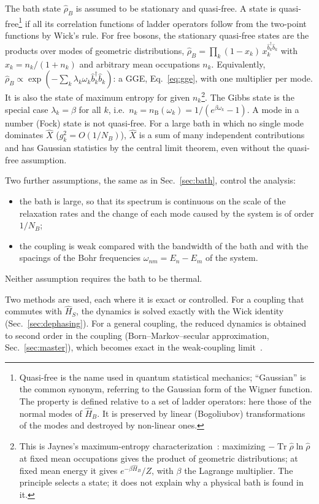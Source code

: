 \documentclass[10pt,a4paper]{article}
\newcommand{\Tr}{\operatorname{Tr}}
\begin{document}
The bath state $ \hat\rho_B $ is assumed to be stationary and quasi-free.
A state is quasi-free\footnote{Quasi-free is the name used in quantum statistical mechanics; ``Gaussian'' is the common synonym, referring to the Gaussian form of the Wigner function. The property is defined relative to a set of ladder operators: here those of the normal modes of $ \hat H_B $. It is preserved by linear (Bogoliubov) transformations of the modes and destroyed by non-linear ones.} if all its correlation functions of ladder operators follow from the two-point functions by Wick's rule.
For free bosons, the stationary quasi-free states are the products over modes of geometric distributions, $ \hat\rho_B = \prod_k (1 - x_k) \, x_k^{\hat b_k^\dagger \hat b_k} $ with $ x_k = n_k/(1+n_k) $ and arbitrary mean occupations $ n_k $.
Equivalently, $ \hat\rho_B \propto \exp(-\sum_k \lambda_k \omega_k \hat b_k^\dagger \hat b_k) $: a GGE, Eq.~\eqref{eq:gge}, with one multiplier per mode.
It is also the state of maximum entropy for given $ n_k $\footnote{This is Jaynes's maximum-entropy characterization~\cite{Jaynes1957}: maximizing $ -\Tr\hat\rho\ln\hat\rho $ at fixed mean occupations gives the product of geometric distributions; at fixed mean energy it gives $ e^{-\beta \hat H_B}/Z $, with $ \beta $ the Lagrange multiplier. The principle selects a state; it does not explain why a physical bath is found in it.}.
The Gibbs state is the special case $ \lambda_k = \beta $ for all $ k $, i.e.\ $ n_k = n_{\mathrm B}(\omega_k) = 1/(e^{\beta\omega_k} - 1) $.
A mode in a number (Fock) state is not quasi-free.
For a large bath in which no single mode dominates $ \hat X $ ($ g_k^2 = O(1/N_B) $), $ \hat X $ is a sum of many independent contributions and has Gaussian statistics by the central limit theorem, even without the quasi-free assumption.

Two further assumptions, the same as in Sec.~\ref{sec:bath}, control the analysis:
\begin{itemize}[leftmargin=1.5em]
\item the bath is large, so that its spectrum is continuous on the scale of the relaxation rates and the change of each mode caused by the system is of order $ 1/N_B $;
\item the coupling is weak compared with the bandwidth of the bath and with the spacings of the Bohr frequencies $ \omega_{nm} = E_n - E_m $ of the system.
\end{itemize}
Neither assumption requires the bath to be thermal.

Two methods are used, each where it is exact or controlled.
For a coupling that commutes with $ \hat H_S $, the dynamics is solved exactly with the Wick identity (Sec.~\ref{sec:dephasing}).
For a general coupling, the reduced dynamics is obtained to second order in the coupling (Born--Markov--secular approximation, Sec.~\ref{sec:master}), which becomes exact in the weak-coupling limit~\cite{Davies1974}.
\end{document}
